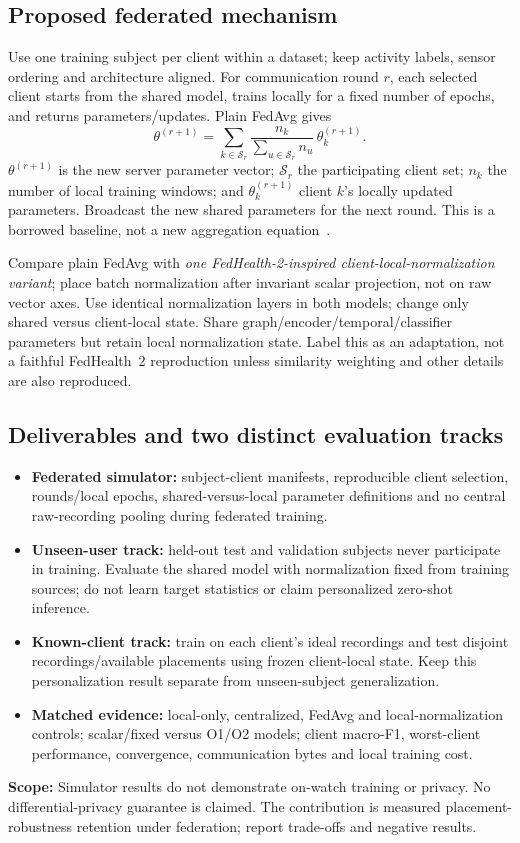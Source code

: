 \documentclass[10pt]{article}
\begin{document}
\subsection*{Proposed federated mechanism}
Use one training subject per client within a dataset; keep activity labels, sensor ordering and architecture aligned. For communication round $r$, each selected client starts from the shared model, trains locally for a fixed number of epochs, and returns parameters/updates. Plain FedAvg gives
\[
\theta^{(r+1)}=\sum_{k\in\mathcal S_r}
\frac{n_k}{\sum_{u\in\mathcal S_r}n_u}\,\theta_k^{(r+1)}.
\]
$\theta^{(r+1)}$ is the new server parameter vector; $\mathcal S_r$ the participating client set; $n_k$ the number of local training windows; and $\theta_k^{(r+1)}$ client $k$'s locally updated parameters. Broadcast the new shared parameters for the next round. This is a borrowed baseline, not a new aggregation equation~\cite{omfedavg}.

Compare plain FedAvg with \emph{one FedHealth-2-inspired client-local-normalization variant}; place batch normalization after invariant scalar projection, not on raw vector axes. Use identical normalization layers in both models; change only shared versus client-local state. Share graph/encoder/temporal/classifier parameters but retain local normalization state. Label this as an adaptation, not a faithful FedHealth~2 reproduction unless similarity weighting and other details are also reproduced.

\subsection*{Deliverables and two distinct evaluation tracks}
\begin{itemize}
\item \textbf{Federated simulator:} subject-client manifests, reproducible client selection, rounds/local epochs, shared-versus-local parameter definitions and no central raw-recording pooling during federated training.
\item \textbf{Unseen-user track:} held-out test and validation subjects never participate in training. Evaluate the shared model with normalization fixed from training sources; do not learn target statistics or claim personalized zero-shot inference.
\item \textbf{Known-client track:} train on each client's ideal recordings and test disjoint recordings/available placements using frozen client-local state. Keep this personalization result separate from unseen-subject generalization.
\item \textbf{Matched evidence:} local-only, centralized, FedAvg and local-normalization controls; scalar/fixed versus O1/O2 models; client macro-F1, worst-client performance, convergence, communication bytes and local training cost.
\end{itemize}
\textbf{Scope:} Simulator results do not demonstrate on-watch training or privacy. No differential-privacy guarantee is claimed. The contribution is measured placement-robustness retention under federation; report trade-offs and negative results.
\end{document}

